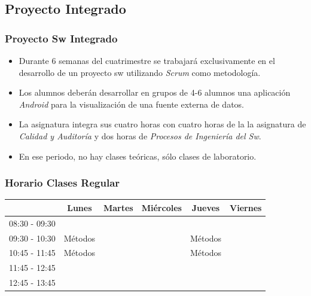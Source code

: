 \documentclass[animated,a4paper,slidestop,xcolor=pst,blue]{beamer}
\begin{document}
\subsection{Proyecto Integrado}

\begin{frame}[c]
	\frametitle{Proyecto Sw Integrado}
	\begin{itemize}[<+->]
        \item Durante 6 semanas del cuatrimestre se trabajará exclusivamente en el desarrollo de un proyecto sw utilizando \emph{Scrum} como metodología.
        \item Los alumnos deberán desarrollar en grupos de 4-6 alumnos una aplicación \emph{Android} para la visualización de una fuente externa de datos.
        \item La asignatura integra sus cuatro horas con cuatro horas de la la asignatura de \emph{Calidad y Auditoría} y dos horas de \emph{Procesos de Ingeniería del Sw}.
        \item En ese periodo, no hay clases teóricas, sólo clases de laboratorio.
	\end{itemize}
\end{frame}

\begin{frame}[c]
	\frametitle{Horario Clases Regular}
	\begin{small}
	\begin{center}
	\begin{tabular}{||l|c|c|c|c|c||}
	\hline \hline
				   & Lunes   & Martes  & Miércoles & Jueves  & Viernes \\ \hline \hline
    08:30 - 09:30  &         &         &           &         &         \\ \hline
    09:30 - 10:30  & Métodos &         &           & Métodos &         \\ \hline
    10:45 - 11:45  & Métodos &         &           & Métodos &         \\ \hline
	11:45 - 12:45  &         &         &           &         &         \\ \hline
	12:45 - 13:45  &         &         &           &         &         \\ \hline \hline
	\end{tabular}
	\end{center}
	\end{small}
\end{frame}
\end{document}

